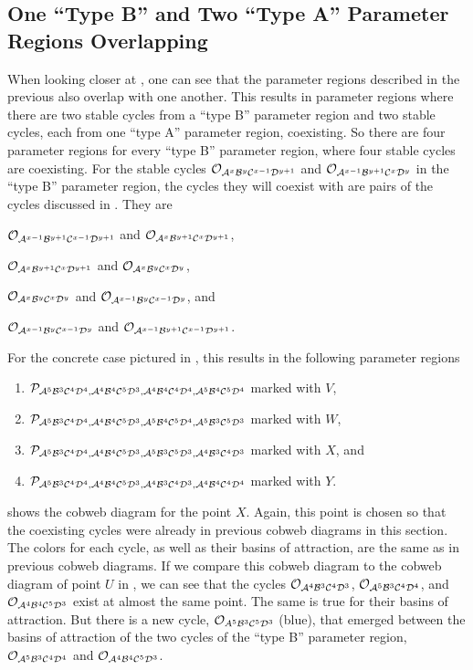 \subsection{One ``Type B'' and Two ``Type A'' Parameter Regions Overlapping}

When looking closer at , one can see that the parameter regions described in the previous  also overlap with one another.
This results in parameter regions where there are two stable cycles from a ``type B'' parameter region and two stable cycles, each from one ``type A'' parameter region, coexisting.
So there are four parameter regions for every ``type B'' parameter region, where four stable cycles are coexisting.
For the stable cycles $\Cycle{\A^x\B^y\C^{x-1}\D^{y+1}}$ and $\Cycle{\A^{x-1}\B^{y+1}\C^x\D^y}$ in the ``type B'' parameter region, the cycles they will coexist with are pairs of the cycles discussed in .
They are
\begin{enumerate*}
    \item $\Cycle{\A^{x-1}\B^{y+1}\C^{x-1}\D^{y+1}}$ and $\Cycle{\A^x\B^{y+1}\C^x\D^{y+1}}$,
    \item $\Cycle{\A^x\B^{y+1}\C^x\D^{y+1}}$ and $\Cycle{\A^x\B^y\C^x\D^y}$,
    \item $\Cycle{\A^x\B^y\C^x\D^y}$ and $\Cycle{\A^{x-1}\B^y\C^{x-1}\D^y}$, and
    \item $\Cycle{\A^{x-1}\B^y\C^{x-1}\D^y}$ and $\Cycle{\A^{x-1}\B^{y+1}\C^{x-1}\D^{y+1}}$.
\end{enumerate*}
For the concrete case pictured in , this results in the following parameter regions
\begin{enumerate}
    \item $\P_{\A^5\B^3\C^4\D^4, \A^4\B^4\C^5\D^3, \A^4\B^4\C^4\D^4, \A^5\B^4\C^5\D^4}$ marked with $V$,
    \item $\P_{\A^5\B^3\C^4\D^4, \A^4\B^4\C^5\D^3, \A^5\B^4\C^5\D^4, \A^5\B^3\C^5\D^3}$ marked with $W$,
    \item $\P_{\A^5\B^3\C^4\D^4, \A^4\B^4\C^5\D^3, \A^5\B^3\C^5\D^3, \A^4\B^3\C^4\D^3}$ marked with $X$, and
    \item $\P_{\A^5\B^3\C^4\D^4, \A^4\B^4\C^5\D^3, \A^4\B^3\C^4\D^3, \A^4\B^4\C^4\D^4}$ marked with $Y$.
\end{enumerate}

 shows the cobweb diagram for the point $X$.
Again, this point is chosen so that the coexisting cycles were already in previous cobweb diagrams in this section.
The colors for each cycle, as well as their basins of attraction, are the same as in previous cobweb diagrams.
If we compare this cobweb diagram to the cobweb diagram of point $U$ in , we can see that the cycles $\Cycle{\A^4\B^3\C^4\D^3}$, $\Cycle{\A^5\B^3\C^4\D^4}$, and $\Cycle{\A^4\B^4\C^5\D^3}$ exist at almost the same point.
The same is true for their basins of attraction.
But there is a new cycle, $\Cycle{A^5\B^3\C^5\D^3}$ (blue), that emerged between the basins of attraction of the two cycles of the ``type B'' parameter region, $\Cycle{\A^5\B^3\C^4\D^4}$ and $\Cycle{\A^4\B^4\C^5\D^3}$.

